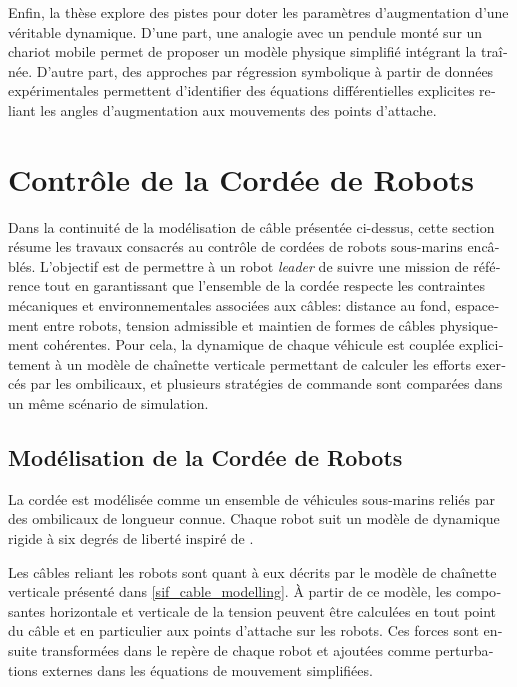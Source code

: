 \begin{otherlanguage}{french}
	Enfin, la thèse explore des pistes pour doter les paramètres d'augmentation d'une véritable
	dynamique. D'une part, une analogie avec un pendule monté sur un chariot mobile permet de proposer
	un modèle physique simplifié intégrant la traînée. D'autre part, des approches par régression
	symbolique à partir de données expérimentales permettent d'identifier des équations différentielles
	explicites reliant les angles d'augmentation aux mouvements des points d'attache.

	\section{Contrôle de la Cordée de Robots}
	\label{sif_robot_chain_control}

	Dans la continuité de la modélisation de câble présentée ci-dessus, cette section résume les
	travaux consacrés au contrôle de cordées de robots sous-marins encâblés. L'objectif est de
	permettre à un robot \emph{leader} de suivre une mission de référence tout en garantissant que
	l'ensemble de la cordée respecte les contraintes mécaniques et environnementales associées aux
	câbles: distance au fond, espacement entre robots, tension admissible et maintien de formes de
	câbles physiquement cohérentes. Pour cela, la dynamique de chaque véhicule est couplée
	explicitement à un modèle de chaînette verticale permettant de calculer les efforts exercés par les
	ombilicaux, et plusieurs stratégies de commande sont comparées dans un même scénario de simulation.

	\subsection{Modélisation de la Cordée de Robots}
	\label{sif_rcc_modelling}

	La cordée est modélisée comme un ensemble de  véhicules sous-marins reliés par des
	ombilicaux de longueur connue. Chaque robot suit un modèle de dynamique rigide à six degrés de
	liberté inspiré de \cite{fossenHandbookMarineCraft2011}.

	Les câbles reliant les robots sont quant à eux décrits par le modèle de chaînette verticale
	présenté dans \cref{sif_cable_modelling}. À partir de ce modèle, les composantes horizontale et
	verticale de la tension peuvent être calculées en tout point du câble et en particulier aux points
	d'attache sur les robots. Ces forces sont ensuite transformées dans le repère de chaque robot et
	ajoutées comme perturbations externes dans les équations de mouvement simplifiées.


\end{otherlanguage}
